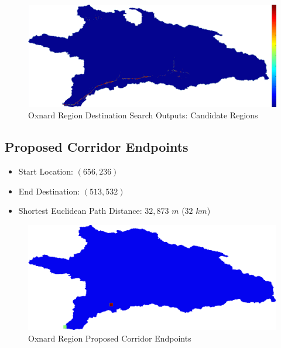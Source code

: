         \begin{figure}[!h]
            \begin{center}
            \includegraphics[width=5.5in]{figures/Oxnard_Search_Output.png}   
            \caption{Oxnard Region Destination Search Outputs: Candidate Regions}
            \label{fig:Odsoutputs_cand}
            \end{center}
        \end{figure}

    \subsection{Proposed Corridor Endpoints}
    
    \begin{itemize}
      \setlength{\itemsep}{0cm}
      \setlength{\parskip}{0cm}
        \item Start Location: $(656,236)$
        \item End Destination: $(513,532)$
        \item Shortest Euclidean Path Distance: $32,873$ $m$ ($32$ $km$)
    \end{itemize}
    
        \begin{figure}[!h]
            \begin{center}
            \includegraphics[width=5.5in]{figures/Oxnard_Endpoints.png}   
            \caption{Oxnard Region Proposed Corridor Endpoints}
            \label{fig:Oendpoints}
            \end{center}
        \end{figure}
            
